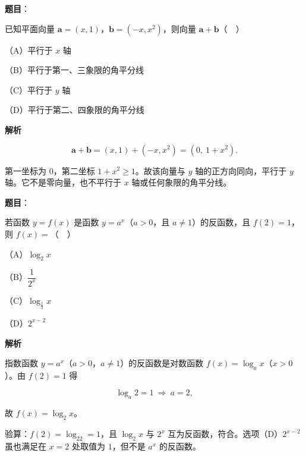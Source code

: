 \begin{answer}

\textbf{题目}：

已知平面向量 $\boldsymbol a=(x,1)$，$\boldsymbol b=(-x,x^2)$，则向量 $\boldsymbol a+\boldsymbol b$（　）

（A）平行于 $x$ 轴

（B）平行于第一、三象限的角平分线

（C）平行于 $y$ 轴

（D）平行于第二、四象限的角平分线

\textbf{解析}

\nopagebreak[4]
\[\boldsymbol a+\boldsymbol b=(x,1)+(-x,x^2)=(0,\ 1+x^2).\]

第一坐标为 $0$，第二坐标 $1+x^2\geqslant1$。故该向量与 $y$ 轴的正方向同向，平行于 $y$ 轴。它不是零向量，也不平行于 $x$ 轴或任何象限的角平分线。


\end{answer}
\begin{answer}

\textbf{题目}：

若函数 $y=f(x)$ 是函数 $y=a^x$（$a>0$，且 $a\neq1$）的反函数，且 $f(2)=1$，则 $f(x)=$（　）

（A）$\log_2 x$

（B）$\dfrac{1}{2^x}$

（C）$\log_{\frac12}x$

（D）$2^{x-2}$

\textbf{解析}

指数函数 $y=a^x$（$a>0$，$a\neq1$）的反函数是对数函数 $f(x)=\log_a x$（$x>0$）。由 $f(2)=1$ 得

\nopagebreak[4]
\[\log_a2=1\ \Longrightarrow\ a=2,\]

故 $f(x)=\log_2x$。

验算：$f(2)=\log_22=1$，且 $\log_2x$ 与 $2^x$ 互为反函数，符合。选项（D）$2^{x-2}$ 虽也满足在 $x=2$ 处取值为 $1$，但不是 $a^x$ 的反函数。


\end{answer}
